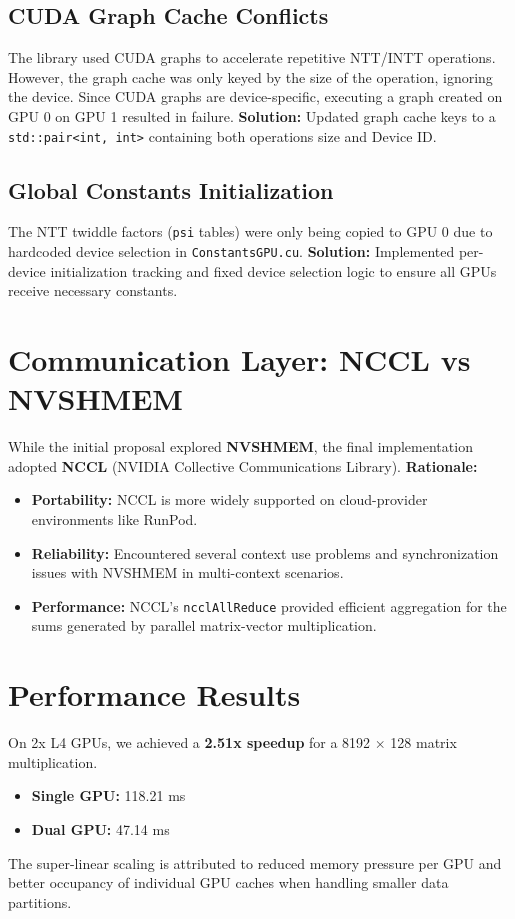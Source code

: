 \documentclass{article}
\begin{document}
\subsection{CUDA Graph Cache Conflicts}
The library used CUDA graphs to accelerate repetitive NTT/INTT operations. However, the graph cache was only keyed by the size of the operation, ignoring the device. Since CUDA graphs are device-specific, executing a graph created on GPU 0 on GPU 1 resulted in failure.
\textbf{Solution:} Updated graph cache keys to a \texttt{std::pair<int, int>} containing both operations size and Device ID.

\subsection{Global Constants Initialization}
The NTT twiddle factors (\texttt{psi} tables) were only being copied to GPU 0 due to hardcoded device selection in \texttt{ConstantsGPU.cu}.
\textbf{Solution:} Implemented per-device initialization tracking and fixed device selection logic to ensure all GPUs receive necessary constants.

\section{Communication Layer: NCCL vs NVSHMEM}
While the initial proposal explored \textbf{NVSHMEM}, the final implementation adopted \textbf{NCCL} (NVIDIA Collective Communications Library). 
\textbf{Rationale:}
\begin{itemize}
    \item \textbf{Portability:} NCCL is more widely supported on cloud-provider environments like RunPod.
    \item \textbf{Reliability:} Encountered several context use problems and synchronization issues with NVSHMEM in multi-context scenarios.
    \item \textbf{Performance:} NCCL's \texttt{ncclAllReduce} provided efficient aggregation for the sums generated by parallel matrix-vector multiplication.
\end{itemize}

\section{Performance Results}
On 2x L4 GPUs, we achieved a \textbf{2.51x speedup} for a 8192 $\times$ 128 matrix multiplication.
\begin{itemize}
    \item \textbf{Single GPU:} 118.21 ms
    \item \textbf{Dual GPU:} 47.14 ms
\end{itemize}
The super-linear scaling is attributed to reduced memory pressure per GPU and better occupancy of individual GPU caches when handling smaller data partitions.
\end{document}
